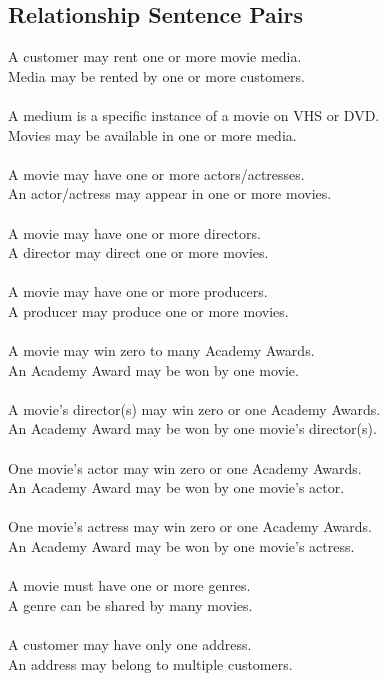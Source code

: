\documentclass[letterpaper,12pt]{article}
\begin{document}
\subsection{Relationship Sentence Pairs}
A customer may rent one or more movie media.\\
Media may be rented by one or more customers.\\
\\
A medium is a specific instance of a movie on VHS or DVD.\\
Movies may be available in one or more media.\\
\\
A movie may have one or more actors/actresses.\\
An actor/actress may appear in one or more movies.\\
\\
A movie may have one or more directors.\\
A director may direct one or more movies.\\
\\
A movie may have one or more producers.\\
A producer may produce one or more movies.\\
\\
A movie may win zero to many Academy Awards.\\
An Academy Award may be won by one movie.\\
\\
A movie's director(s) may win zero or one Academy Awards.\\
An Academy Award may be won by one movie's director(s).\\
\\
One movie's actor may win zero or one Academy Awards.\\
An Academy Award may be won by one movie's actor.\\
\\
One movie's actress may win zero or one Academy Awards.\\
An Academy Award may be won by one movie's actress.\\
\\
A movie must have one or more genres.\\
A genre can be shared by many movies.\\
\\
A customer may have only one address.\\
An address may belong to multiple customers.\\
\\
\end{document}
